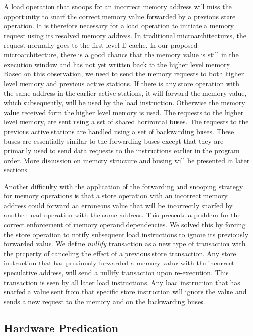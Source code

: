 \documentclass[10pt,twocolumn]{IEEEtran}
\begin{document}
A load operation that snoops for an incorrect memory address will miss
the opportunity to snarf the correct memory value forwarded by a
previous store operation.  It is therefore necessary for a load
operation to initiate a memory request using its resolved memory
address.  In traditional microarchitectures, the request normally goes
to the first level D-cache.  In our proposed microarchitecture, there
is a good chance that the memory value is still in the execution window
and has not yet written back to the higher level memory.  Based on this
observation, we need to send the memory requests to both higher level
memory and previous active stations.  If there is any store operation
with the same address in the earlier active stations, it will forward
the memory value, which subsequently, will be used by the load
instruction.  Otherwise the memory value received form the higher level
memory is used.  The requests to the higher level memory, are sent
using a set of shared horizontal buses.  The requests to the previous
active stations are handled using a set of backwarding buses. These
buses are essentially similar to the forwarding buses except that they
are primarily used to send data requests to the instructions earlier in
the program order.   More discussion on memory structure and busing
will be presented in later sections.

Another difficulty with the application of the forwarding and snooping
strategy for memory operations is that a store operation with an
incorrect memory address could forward an erroneous value that will be
incorrectly snarfed by another load operation with the same address.
This presents a problem for the correct enforcement of memory operand
dependencies.  We solved this by forcing the store operation to notify
subsequent load instructions to ignore its previously forwarded value.
We define \emph{nullify} transaction as a new type of transaction with
the property of canceling the effect of a previous store transaction.
Any store instruction that has previously forwarded a memory value with
the incorrect speculative address, will send a nullify transaction upon
re-execution.  This transaction is seen by all later load
instructions.  Any load instruction that has snarfed a value sent from
that specific store instruction will ignore the value and sends a new
request to the memory and on the backwarding buses.

\subsection {Hardware Predication}
\end{document}
